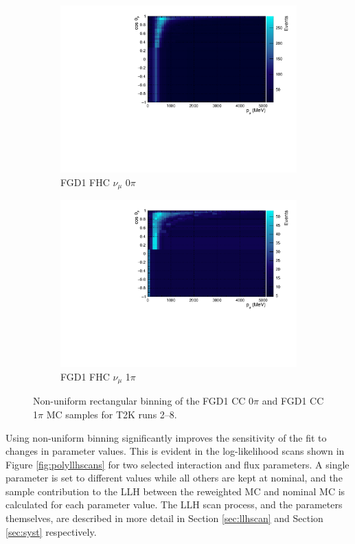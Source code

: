 \begin{figure}
\centering
\begin{subfigure}{.49\textwidth}
  \centering
  \includegraphics[width=0.95\linewidth]{figs/TH2Poly_MC_FGD1_numuCC_0pi}
  \caption{FGD1 FHC $\nu_{\mu}$ 0$\pi$}
  \label{fig:th2polyFGD1_numuCC_0pi}
\end{subfigure}
\begin{subfigure}{.49\textwidth}
  \centering
  \includegraphics[width=0.95\linewidth]{figs/TH2Poly_MC_FGD1_numuCC_1pi}
  \caption{FGD1 FHC $\nu_{\mu}$ 1$\pi$}
  \label{fig:th2polyFGD1_numuCC_1pi}
\end{subfigure}
\caption{Non-uniform rectangular binning of the FGD1 CC 0$\pi$ and FGD1 CC 1$\pi$ MC samples for T2K runs 2--8.}
\label{fig:th2polybin}
\end{figure}

Using non-uniform binning significantly improves the sensitivity of the fit to changes in parameter values. This is evident in the log-likelihood scans shown in Figure \ref{fig:polyllhscans} for two selected interaction and flux parameters. A single parameter is set to different values while all others are kept at nominal, and the sample contribution to the LLH between the reweighted MC and nominal MC is calculated for each parameter value. The LLH scan process, and the parameters themselves, are described in more detail in Section \ref{sec:llhscan} and Section \ref{sec:syst} respectively.

